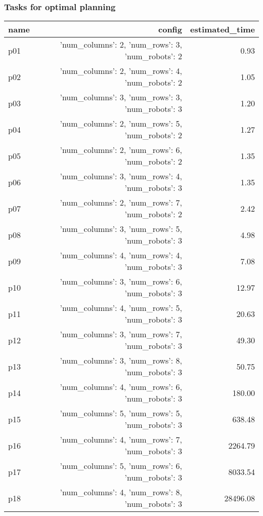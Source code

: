 \documentclass{article}
\begin{document}
                                \subsubsection*{Tasks for optimal planning}
                                
                            \begin{center}
                            \scriptsize
                            \begin{tabular}{@{}l|r|r@{}}
                            name & config & estimated\_time\\\midrule
                              p01&{'num\_columns': 2, 'num\_rows': 3, 'num\_robots': 2}&0.93\\
  p02&{'num\_columns': 2, 'num\_rows': 4, 'num\_robots': 2}&1.05\\
  p03&{'num\_columns': 3, 'num\_rows': 3, 'num\_robots': 3}&1.20\\
  p04&{'num\_columns': 2, 'num\_rows': 5, 'num\_robots': 2}&1.27\\
  p05&{'num\_columns': 2, 'num\_rows': 6, 'num\_robots': 2}&1.35\\
  p06&{'num\_columns': 3, 'num\_rows': 4, 'num\_robots': 3}&1.35\\
  p07&{'num\_columns': 2, 'num\_rows': 7, 'num\_robots': 2}&2.42\\
  p08&{'num\_columns': 3, 'num\_rows': 5, 'num\_robots': 3}&4.98\\
  p09&{'num\_columns': 4, 'num\_rows': 4, 'num\_robots': 3}&7.08\\
  p10&{'num\_columns': 3, 'num\_rows': 6, 'num\_robots': 3}&12.97\\
  p11&{'num\_columns': 4, 'num\_rows': 5, 'num\_robots': 3}&20.63\\
  p12&{'num\_columns': 3, 'num\_rows': 7, 'num\_robots': 3}&49.30\\
  p13&{'num\_columns': 3, 'num\_rows': 8, 'num\_robots': 3}&50.75\\
  p14&{'num\_columns': 4, 'num\_rows': 6, 'num\_robots': 3}&180.00\\
  p15&{'num\_columns': 5, 'num\_rows': 5, 'num\_robots': 3}&638.48\\
  p16&{'num\_columns': 4, 'num\_rows': 7, 'num\_robots': 3}&2264.79\\
  p17&{'num\_columns': 5, 'num\_rows': 6, 'num\_robots': 3}&8033.54\\
  p18&{'num\_columns': 4, 'num\_rows': 8, 'num\_robots': 3}&28496.08\\

\end{tabular}
\end{center}
\end{document}
